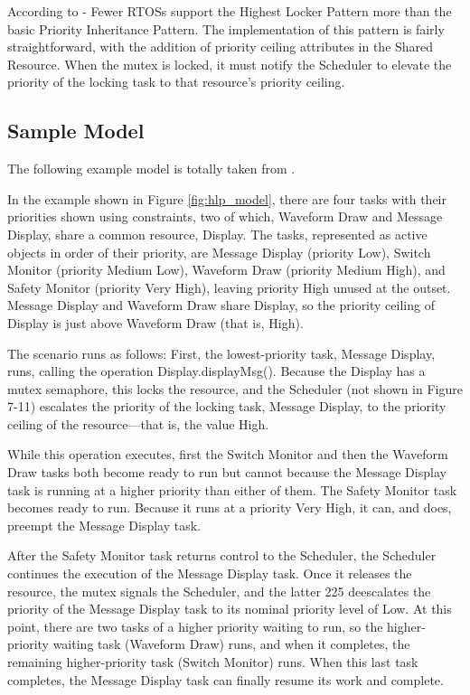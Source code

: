 According to \cite{b6} - Fewer RTOSs support the Highest Locker Pattern more than the basic Priority Inheritance Pattern. The implementation of this pattern  is fairly straightforward, with the addition of priority ceiling attributes in the Shared Resource. When the mutex is locked, it must notify the Scheduler to elevate the priority of the locking task to that resource's priority ceiling.

\subsection{Sample Model} 

The following example model is totally taken from \cite{b6}.

In the example shown in Figure \ref{fig:hlp_model}, there are four tasks with their priorities shown using constraints, two of which, Waveform Draw and Message Display, share a common resource, Display. The tasks, represented as active objects in order of their priority, are Message Display (priority Low), Switch Monitor (priority Medium Low), Waveform Draw (priority Medium High), and Safety Monitor (priority Very High), leaving priority High unused at the outset. Message Display and Waveform Draw share Display, so the priority ceiling of Display is just above Waveform Draw (that is, High). 

The scenario runs as follows: First, the lowest-priority task, Message Display, runs, calling the operation Display.displayMsg(). Because the Display has a mutex semaphore, this locks the resource, and the Scheduler (not shown in Figure 7-11) escalates the priority of the locking task, Message Display, to the priority ceiling of the resource—that is, the value High.
 
While this operation executes, first the Switch Monitor and then the Waveform Draw tasks both become ready to run but cannot because the Message Display task is running at a higher priority than either of them. The Safety Monitor task becomes ready to run. Because it runs at a priority Very High, it can, and does, preempt the Message Display task. 

After the Safety Monitor task returns control to the Scheduler, the Scheduler continues the execution of the Message Display task. Once it releases the resource, the mutex signals the Scheduler, and the latter  225 deescalates the priority of the Message Display task to its nominal priority level of Low. At this point, there are two tasks of a higher priority waiting to run, so the higher-priority waiting task (Waveform Draw) runs, and when it completes, the remaining higher-priority task (Switch Monitor) runs. When this last task completes, the Message Display task can finally resume its work and complete.

